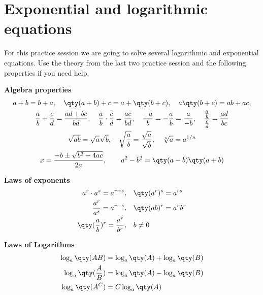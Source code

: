 \documentclass[../main.tex]{subfiles}
\begin{document}
\section{Exponential and logarithmic equations}

For this practice session we are going to solve several logarithmic and exponential equations.
Use the theory from the last two practice session and the following properties if you need help.


\begin{minipage}[c]{\textwidth}
    \centering
    {\bfseries\large Algebra properties}
    \begin{gather*}
        a+b = b+a, \quad
        \qty(a+b)+c = a+\qty(b+c), \quad
        a\qty(b+c) = ab+ac, \\
        \frac{a}{b} + \frac{c}{d} = \frac{ad+bc}{bd}, \quad
        \frac{a}{b} \cdot \frac{c}{d} = \frac{ac}{bd}, \quad
        \frac{-a}{b} = -\frac{a}{b} = \frac{a}{-b}, \quad
        \frac{\frac{a}{b}}{\frac{c}{d}} = \frac{ad}{bc}
        \\
        \sqrt{ab} = \sqrt{a}\sqrt{b},\quad
        \sqrt{\frac{a}{b}} = \frac{\sqrt{a}}{\sqrt{b}},\quad
        \sqrt[n]{a} = a^{1/n}
        \\
        x=\frac{-b\pm\sqrt{b^2-4ac}}{2a},\qquad
        a^2-b^2 = \qty(a-b)\qty(a+b)
    \end{gather*}
\end{minipage}

\begin{minipage}[c]{0.45\textwidth}
    \centering
    {\bfseries\large Laws of exponents}
    \begin{align*}
        a^r\cdot a^s = a^{r+s}, \quad & \qty(a^r)^s = a^{rs} \\
        \frac{a^r}{a^s} = a^{r-s}, \quad & \qty(ab)^r = a^r b^r \\
        \qty(\frac{a}{b})^r = \frac{a^r}{b^r},\quad & b\neq 0
    \end{align*}
\end{minipage}
\begin{minipage}[c]{0.45\textwidth}
    \centering
    {\bfseries\large Laws of Logarithms}
    \begin{align*}
        \log_a\qty(AB) &= \log_a\qty(A) + \log_a\qty(B) \\
        \log_a\qty(\frac{A}{B}) &= \log_a\qty(A) - \log_a\qty(B) \\
        \log_a\qty(A^C) &= C\log_a\qty(A)
    \end{align*}
\end{minipage}
\end{document}
